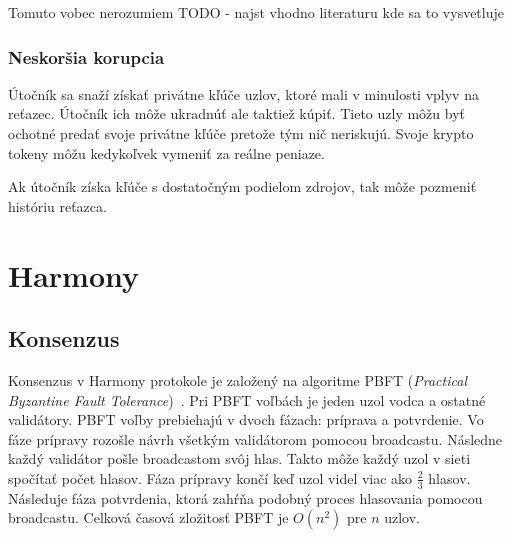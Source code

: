 Tomuto vobec nerozumiem TODO - najst vhodno literaturu kde sa to vysvetluje

\subsection{Neskoršia korupcia}
Útočník sa snaží získať privátne kľúče uzlov, ktoré mali v minulosti vplyv na reťazec. Útočník ich môže ukradnúť ale taktiež kúpiť. Tieto uzly môžu byť ochotné predať svoje privátne kľúče pretože tým nič neriskujú. Svoje krypto tokeny môžu kedykoľvek vymeniť za reálne peniaze.

Ak útočník získa kľúče s dostatočným podielom zdrojov, tak môže pozmeniť históriu reťazca. 

\chapter{Harmony}

\section{Konsenzus}

Konsenzus v Harmony protokole je založený na algoritme PBFT (\textit{Practical Byzantine Fault Tolerance})~\cite{pbftCastro}. Pri PBFT voľbách je jeden uzol vodca a ostatné validátory. PBFT voľby prebiehajú v dvoch fázach: príprava a potvrdenie. Vo fáze prípravy rozošle návrh všetkým validátorom pomocou broadcastu. Následne každý validátor pošle broadcastom svôj hlas. Takto môže každý uzol v sieti spočítať počet hlasov. Fáza prípravy končí keď uzol videl viac ako $\frac{2}{3}$ hlasov. Následuje fáza potvrdenia, ktorá zahŕňa podobný proces hlasovania pomocou broadcastu. Celková časová zložitosť PBFT je $O(n^2)$ pre $n$ uzlov.

